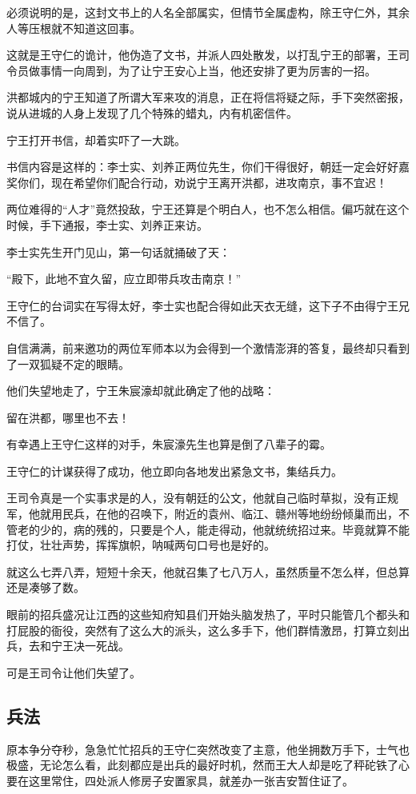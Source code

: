 \begin{multicols}{\theparacolNo}
必须说明的是，这封文书上的人名全部属实，但情节全属虚构，除王守仁外，其余人等压根就不知道这回事。

这就是王守仁的诡计，他伪造了文书，并派人四处散发，以打乱宁王的部署，王司令员做事情一向周到，为了让宁王安心上当，他还安排了更为厉害的一招。

洪都城内的宁王知道了所谓大军来攻的消息，正在将信将疑之际，手下突然密报，说从进城的人身上发现了几个特殊的蜡丸，内有机密信件。

宁王打开书信，却着实吓了一大跳。

书信内容是这样的：李士实、刘养正两位先生，你们干得很好，朝廷一定会好好嘉奖你们，现在希望你们配合行动，劝说宁王离开洪都，进攻南京，事不宜迟！

两位难得的“人才”竟然投敌，宁王还算是个明白人，也不怎么相信。偏巧就在这个时候，手下通报，李士实、刘养正来访。

李士实先生开门见山，第一句话就捅破了天：

“殿下，此地不宜久留，应立即带兵攻击南京！”

王守仁的台词实在写得太好，李士实也配合得如此天衣无缝，这下子不由得宁王兄不信了。

自信满满，前来邀功的两位军师本以为会得到一个激情澎湃的答复，最终却只看到了一双狐疑不定的眼睛。

他们失望地走了，宁王朱宸濠却就此确定了他的战略：

留在洪都，哪里也不去！

有幸遇上王守仁这样的对手，朱宸濠先生也算是倒了八辈子的霉。

王守仁的计谋获得了成功，他立即向各地发出紧急文书，集结兵力。

王司令真是一个实事求是的人，没有朝廷的公文，他就自己临时草拟，没有正规军，他就用民兵，在他的召唤下，附近的袁州、临江、赣州等地纷纷倾巢而出，不管老的少的，病的残的，只要是个人，能走得动，他就统统招过来。毕竟就算不能打仗，壮壮声势，挥挥旗帜，呐喊两句口号也是好的。

就这么七弄八弄，短短十余天，他就召集了七八万人，虽然质量不怎么样，但总算还是凑够了数。

眼前的招兵盛况让江西的这些知府知县们开始头脑发热了，平时只能管几个都头和打屁股的衙役，突然有了这么大的派头，这么多手下，他们群情激昂，打算立刻出兵，去和宁王决一死战。

可是王司令让他们失望了。

\subsection{兵法}
原本争分夺秒，急急忙忙招兵的王守仁突然改变了主意，他坐拥数万手下，士气也极盛，无论怎么看，此刻都应是出兵的最好时机，然而王大人却是吃了秤砣铁了心要在这里常住，四处派人修房子安置家具，就差办一张吉安暂住证了。


\end{multicols}
